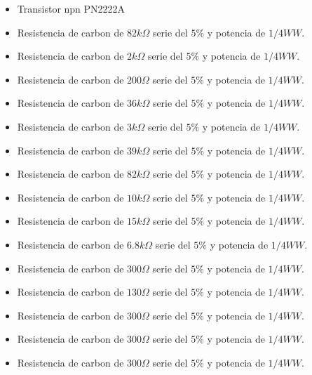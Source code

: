 \documentclass[10pt, a4paper]{article}
\begin{document}
    \begin{itemize}
        \item Transistor npn PN2222A
        \item Resistencia de carbon de $82k\Omega$  serie del $5\%$ y potencia de ${1/4 W} W$.
        \item Resistencia de carbon de $2k\Omega$  serie del $5\%$ y potencia de ${1/4 W} W$.
        \item Resistencia de carbon de $200\Omega$  serie del $5\%$ y potencia de ${1/4 W} W$.
        \item Resistencia de carbon de $36k\Omega$  serie del $5\%$ y potencia de ${1/4 W} W$.
        \item Resistencia de carbon de $3k\Omega$  serie del $5\%$ y potencia de ${1/4 W} W$.
        \item Resistencia de carbon de $39k\Omega$  serie del $5\%$ y potencia de ${1/4 W} W$.
        \item Resistencia de carbon de $82k\Omega$  serie del $5\%$ y potencia de ${1/4 W} W$.
        \item Resistencia de carbon de $10k\Omega$  serie del $5\%$ y potencia de ${1/4 W} W$.
        \item Resistencia de carbon de $15k\Omega$  serie del $5\%$ y potencia de ${1/4 W} W$.
        \item Resistencia de carbon de $6.8k\Omega$  serie del $5\%$ y potencia de ${1/4 W} W$.
        \item Resistencia de carbon de $300\Omega$  serie del $5\%$ y potencia de ${1/4 W} W$.
        \item Resistencia de carbon de $130\Omega$  serie del $5\%$ y potencia de ${1/4 W} W$.
        \item Resistencia de carbon de $300\Omega$  serie del $5\%$ y potencia de ${1/4 W} W$.
        \item Resistencia de carbon de $300\Omega$  serie del $5\%$ y potencia de ${1/4 W} W$.
        \item Resistencia de carbon de $300\Omega$  serie del $5\%$ y potencia de ${1/4 W} W$.
    \end{itemize}
\end{document}
